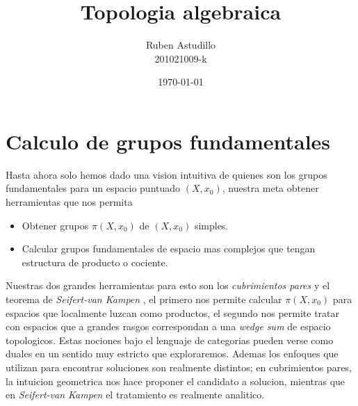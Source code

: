 \documentclass[letterpaper]{article}
\newcommand{\vank}{\emph{Seifert-van Kampen} }
\theoremstyle{definition}
\theoremstyle{plain}
\theoremstyle{plain}
\theoremstyle{plain}
\theoremstyle{remark}
\begin{document}
\title{Topologia algebraica}
\author{Ruben Astudillo \\ 201021009-k}
\date{\today}
\maketitle





\section{Calculo de grupos fundamentales}
Hasta ahora solo hemos dado una vision intuitiva de quienes son los
grupos fundamentales para un espacio puntuado \((X,x_0)\), nuestra meta
obtener herramientas que nos permita
\begin{itemize}
\item Obtener grupos \(\pi (X, x_0)\) de \((X,x_0)\) simples.
\item Calcular grupos fundamentales de espacio mas complejos que tengan
  estructura de producto o cociente.
\end{itemize}
Nuestras dos grandes herramientas para esto son los \emph{cubrimientos
  pares} y el teorema de \vank , el primero nos
permite calcular \(\pi (X, x_0)\) para espacios que localmente luzcan
como productos, el segundo nos permite tratar con espacios que a grandes
rasgos correspondan a una \emph{wedge sum} de espacio topologicos. Estas
nociones bajo el lenguaje de categorias pueden verse como duales en un
sentido muy estricto que exploraremos. Ademas los enfoques que utilizan
para encontrar soluciones son realmente distintos; en cubrimientos pares,
la intuicion geometrica nos hace proponer el candidato a solucion,
mientras que en \vank el tratamiento es realmente analitico.


\end{document}
